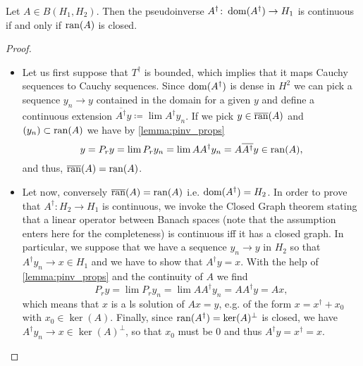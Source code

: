 \begin{lemma}
\begin{thm}
\label{thm:pinv_continuity}
    Let $A \in B(H_1,H_2)$.
    Then the pseudoinverse 
    $A^\dagger \colon \operatorname{dom}(A^\dagger) \to H_1$ is
    continuous if and only if $\operatorname{ran}(A)$ is closed.
\end{thm}
\begin{proof}
    \begin{itemize}
        \item Let us first suppose that $T^\dagger$ is bounded,
            which implies that it maps Cauchy sequences to Cauchy 
            sequences.
            Since $\operatorname{dom}(A^\dagger)$ is dense in $H^2$ we can 
            pick a sequence $y_n \to y$ contained in the domain 
            for a given $y$ and define a continuous extension
            $\overline{A^\dagger} y \coloneqq \lim A^\dagger y_n$.
            If we pick $y \in \overline{\operatorname{ran}}(A)$ and 
            $(y_n) \subset \operatorname{ran}(A)$ we have by \cref{lemma:pinv_props}
            \begin{equation*}
                y = P_r y = \lim P_r y_n = \lim A A^\dagger y_n
                    = A \overline{A^\dagger} y \in \operatorname{ran}(A),
            \end{equation*}
            and thus, $\overline{\operatorname{ran}}(A) = \operatorname{ran}(A)$.
        \item Let now, conversely $\overline{\operatorname{ran}}(A) = \operatorname{ran}(A)$
            i.e. $\operatorname{dom}(A^\dagger) = H_2$.
            In order to prove that $A^\dagger \colon H_2 \to H_1$ is 
            continuous, we invoke the Closed Graph theorem stating 
            that a linear operator between Banach spaces 
            (note that the assumption enters here for the 
            completeness)
            is continuous iff it has a closed graph.
            In particular, we suppose that we have a sequence
            $y_n \to y$ in $H_2$ so that $A^\dagger y_n \to x \in H_1$ 
            and we have to show that $A^\dagger y = x$.
            With the help of \cref{lemma:pinv_props} and the 
            continuity of $A$ we find 
            \begin{equation*}
                P_r y = \lim P_r y_n = \lim AA^\dagger y_n 
                = A A^\dagger y = A x,
            \end{equation*}
            which means that $x$ is a ls solution of $Ax = y$, 
            e.g. of the form $x = x^\dagger + x_0$ with 
            $x_0 \in \ker(A)$.
            Finally, since $\operatorname{ran}(A^\dagger) = \ker(A)^\perp$ is 
            closed, 
            we have $A^\dagger y_n \to x \in \ker(A)^\perp$,
            so that $x_0$ must be 0 and thus
            $A^\dagger y = x^\dagger = x$.
    \end{itemize}
\end{proof}


\end{lemma}
